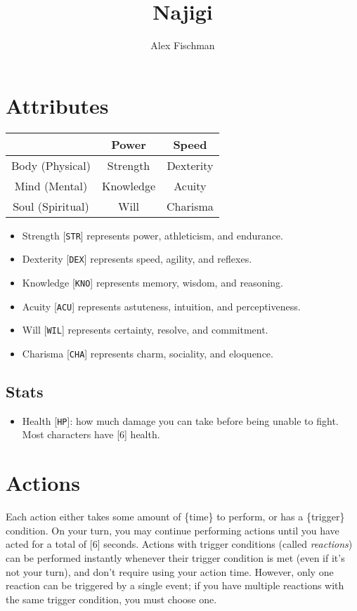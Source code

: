 \documentclass[12pt]{article}
\title{Najigi}
\author{Alex Fischman}
\newcommand{\STR}{\texttt{STR}}
\newcommand{\DEX}{\texttt{DEX}}
\newcommand{\KNO}{\texttt{KNO}}
\newcommand{\ACU}{\texttt{ACU}}
\newcommand{\WIL}{\texttt{WIL}}
\newcommand{\CHA}{\texttt{CHA}}
\newcommand{\HP}{\texttt{HP}}
\begin{document}
\maketitle
\tableofcontents
\clearpage

\pagebreak
\section{Attributes}

\begin{tabularx}{\textwidth}{C|C C}
& Power & Speed \\\hline
Body (Physical) & Strength & Dexterity \\
Mind (Mental) & Knowledge & Acuity \\
Soul (Spiritual) & Will & Charisma
\end{tabularx}

\begin{itemize}
\item Strength [\STR] represents power, athleticism, and endurance.
\item Dexterity [\DEX] represents speed, agility, and reflexes.
\item Knowledge [\KNO] represents memory, wisdom, and reasoning.
\item Acuity [\ACU] represents astuteness, intuition, and perceptiveness.
\item Will [\WIL] represents certainty, resolve, and commitment.
\item Charisma [\CHA] represents charm, sociality, and eloquence.
\end{itemize}

\subsection{Stats}

\begin{itemize}
\item Health [\HP]: how much damage you can take before being unable to fight. Most characters have [6] health.
\end{itemize}

\pagebreak
\section{Actions}

Each action either takes some amount of \{time\} to perform, or has a \{trigger\} condition. On your turn, you may continue performing actions until you have acted for a total of [6] seconds. Actions with trigger conditions (called \textit{reactions}) can be performed instantly whenever their trigger condition is met (even if it’s not your turn), and don’t require using your action time. However, only one reaction can be triggered by a single event; if you have multiple reactions with the same trigger condition, you must choose one.
\end{document}
